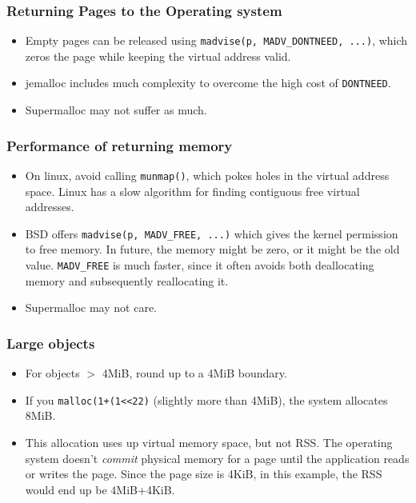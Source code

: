 \documentclass[xcolor=dvipsnames,14pt]{beamer}
\begin{document}
\begin{frame}
\frametitle{Returning Pages to the Operating system}

\begin{itemize}
\item Empty pages can be released using
\texttt{madvise(p, MADV_DONTNEED, ...)}, which zeros the page while keeping the virtual address valid.

\item jemalloc includes much complexity to overcome the high cost of
  \texttt{DONTNEED}.

\item Supermalloc may not suffer as much.
\end{itemize}
\end{frame}

\begin{frame}
\frametitle{Performance of returning memory}

\begin{itemize}

\item On linux, avoid calling \texttt{munmap()}, which pokes
  holes in the virtual address space.  Linux has a slow algorithm for
  finding contiguous free virtual addresses.

\item BSD offers \texttt{madvise(p, MADV_FREE, ...)} which
  gives the kernel permission to free memory.  In future, the memory
  might be zero, or it might be the old value.
  \texttt{MADV_FREE} is much faster, since it often avoids both
  deallocating memory and subsequently reallocating it.

\item Supermalloc may not care.
\end{itemize}
\end{frame}

\begin{frame}
\frametitle{Large objects}
\begin{itemize}
\item For objects $>$ 4MiB, round up to a 4MiB boundary.
\item If you \texttt{malloc(1+(1<<22)} (slightly more than 4MiB), the system allocates 8MiB.  
\item This allocation uses up virtual memory space, but not RSS\@.
  The operating system doesn't \textit{commit} physical memory for a
  page until the application reads or writes the page.  Since the page
  size is 4KiB, in this example, the RSS would end up be 4MiB+4KiB.
\end{itemize}
\end{frame}
\end{document}
